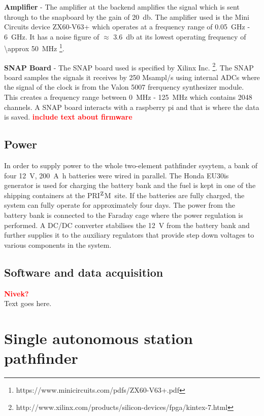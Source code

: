 \documentclass{ws-jai}
\def\prizm{PRI$^{\rm Z}$M}
\begin{document}
\textbf{Amplifier} - The amplifier at the backend amplifies the signal
which is sent through to the snapboard by the gain of
\SI{+20}{\decibel}. The amplifier used is the Mini Circuits device
ZX60-V63+ which operates at a frequency range of \SI{0.05}{GHz} -
\SI{6}{GHz}. It has a noise figure of $\approx$ \SI{3.6}{\decibel} at
its lowest operating frequency of \SI{\approx
  50}{MHz} \footnote{https://www.minicircuits.com/pdfs/ZX60-V63+.pdf}.

\textbf{SNAP Board} - The SNAP board used is specified by Xilinx
Inc. \footnote{http://www.xilinx.com/products/silicon-devices/fpga/kintex-7.html}. The
SNAP board samples the signals it receives by 250 Msampl/s using
internal ADCs where the signal of the clock is from the Valon 5007
frerquency synthesizer module. This creates a frequency range between
\SI{0}{MHz} - \SI{125}{MHz} which contains 2048 channels. A SNAP board
interacts with a raspberry pi and that is where the data is saved.
\textcolor{red}{\bf include text about firmware}

\subsection{Power}

In order to supply power to the whole two-element pathfinder sysytem, a bank of four \SI{12}{V}, \SI{200}{\ampere\hour} batteries were wired in parallel. The Honda EU30is generator is used for charging the battery bank and the fuel is kept in one of the shipping containers at the \prizm\ site. If the batteries are fully charged, the system can fully operate for approximately four days. The power from the battery bank is connected to the Faraday cage where the power regulation is performed. A DC/DC converter stabilises the \SI{12}{V} from the battery bank and further supplies it to the auxiliary regulators that provide step down voltages to various components in the system.

\subsection{Software and data acquisition}
\textcolor{red}{\bf Nivek?} \\
Text goes here.

\section{Single autonomous station pathfinder}
\end{document}
